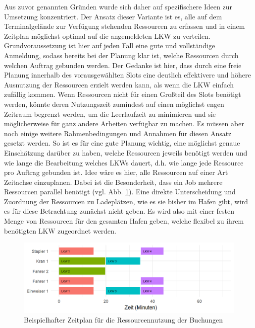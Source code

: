 Aus zuvor genannten Gründen wurde sich daher auf spezifischere Ideen zur Umsetzung konzentriert. Der Ansatz dieser Variante ist es, alle auf dem Terminalgelände zur Verfügung stehenden Ressourcen zu erfassen und in einem Zeitplan möglichst optimal auf die angemeldeten LKW zu verteilen. Grundvoraussetzung ist hier auf jeden Fall eine gute und vollständige Anmeldung, sodass bereits bei der Planung klar ist, welche Ressourcen durch welchen Auftrag gebunden werden. Der Gedanke ist hier, dass durch eine freie Planung innerhalb des vorausgewählten Slots eine deutlich effektivere und höhere Ausnutzung der Ressourcen erzielt werden kann, als wenn die LKW einfach zufällig kommen. Wenn Ressourcen nicht für einen Großteil des Slots benötigt werden, könnte deren Nutzungszeit zumindest auf einen möglichst engen Zeitraum begrenzt werden, um die Leerlaufzeit zu minimieren und sie möglicherweise für ganz andere Arbeiten verfügbar zu machen. Es müssen aber noch einige weitere Rahmenbedingungen und Annahmen für diesen Ansatz gesetzt werden. So ist es für eine gute Planung wichtig, eine möglichst genaue Einschätzung darüber zu haben, welche Ressourcen jeweils benötigt werden und wie lange die Bearbeitung welches LKWs dauert, d.h. wie lange jede Ressource pro Auftrag gebunden ist. Idee wäre es hier, alle Ressourcen auf einer Art Zeitachse einzuplanen. Dabei ist die Besonderheit, dass ein Job mehrere Ressourcen parallel benötigt (vgl. Abb. \ref{fig:rsExampleSchedule}). Eine direkte Unterscheidung und Zuordnung der Ressourcen zu Ladeplätzen, wie es sie bisher im Hafen gibt, wird es für diese Betrachtung zunächst nicht geben. Es wird also mit einer festen Menge von Ressourcen für den gesamten Hafen geben, welche flexibel zu ihrem benötigten LKW zugeordnet werden.
\begin{figure}[H]
    \centering
    \includegraphics[width=\textwidth]{images/timelines/rsExampleSchedule.png}
    \caption{Beispielhafter Zeitplan für die Ressourcennutzung der Buchungen}
    \label{fig:rsExampleSchedule}
\end{figure}

